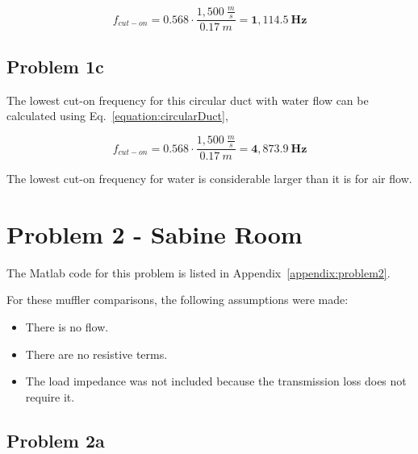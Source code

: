 \vspace{-0.25cm}
\begin{equation*}
    f_{cut-on} = 0.568 \cdot \frac{ 1,500~\frac{m}{s} }{ 0.17~m } = \boldsymbol{1,114.5~Hz}
\end{equation*}




\vspace{-0.25cm}
\subsection*{Problem 1c}

The lowest cut-on frequency for this circular duct with water flow can be calculated using Eq.~\ref{equation:circularDuct},

\vspace{-0.25cm}
\begin{equation*}
    f_{cut-on} = 0.568 \cdot \frac{ 1,500~\frac{m}{s} }{ 0.17~m } = \boldsymbol{4,873.9~Hz}
\end{equation*}

\vspace{0.25cm}
The lowest cut-on frequency for water is considerable larger than it is for air flow.









\newpage
\section*{Problem 2 - Sabine Room}

The Matlab code for this problem is listed in Appendix~\ref{appendix:problem2}.

\vspace{0.25cm}
For these muffler comparisons, the following assumptions were made:

\begin{itemize}
  \item There is no flow.
  \item There are no resistive terms.
  \item The load impedance was not included because the transmission loss does not require it.
\end{itemize}


\vspace{-0.25cm}
\subsection*{Problem 2a}

